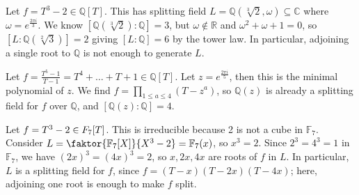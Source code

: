 \begin{example}
	Let \( f = T^3 - 2 \in \mathbb Q[T] \).
	This has splitting field \( L = \mathbb Q(\sqrt[3]{2}, \omega) \subseteq \mathbb C \) where \( \omega = e^{\frac{2\pi i}{3}} \).
	We know \( [\mathbb Q(\sqrt[3]{2}) : \mathbb Q] = 3 \), but \( \omega \not\in \mathbb R \) and \( \omega^2 + \omega + 1 = 0 \), so \( [L : \mathbb Q(\sqrt[2]{3})] = 2 \) giving \( [L : \mathbb Q] = 6 \) by the tower law.
	In particular, adjoining a single root to \( \mathbb Q \) is not enough to generate \( L \).
\end{example}
\begin{example}
	Let \( f = \frac{T^5 - 1}{T - 1} = T^4 + \dots + T + 1 \in \mathbb Q[T] \).
	Let \( z = e^{\frac{2\pi i}{5}} \), then this is the minimal polynomial of \( z \).
	We find \( f = \prod_{1 \leq a \leq 4} (T - z^a) \), so \( \mathbb Q(z) \) is already a splitting field for \( f \) over \( \mathbb Q \), and \( [\mathbb Q(z) : \mathbb Q] = 4 \).
\end{example}
\begin{example}
	Let \( f = T^3 - 2 \in \mathbb \mathbb F_7[T] \).
	This is irreducible because 2 is not a cube in \( \mathbb F_7 \).
	Consider \( L = \faktor{\mathbb F_7[X]}{X^3 - 2} = \mathbb F_7(x) \), so \( x^3 = 2 \).
	Since \( 2^3 = 4^3 = 1 \) in \( \mathbb F_7 \), we have \( (2x)^3 = (4x)^3 = 2 \), so \( x, 2x, 4x \) are roots of \( f \) in \( L \).
	In particular, \( L \) is a splitting field for \( f \), since \( f = (T - x)(T - 2x)(T - 4x) \); here, adjoining one root is enough to make \( f \) split.
\end{example}

